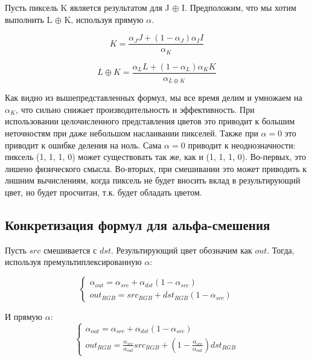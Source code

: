 Пусть пиксель K является результатом для  J $\oplus$ I. Предположим, что мы хотим выполнить L $\oplus$ K, используя прямую $\alpha$.

\begin{equation}
K = \frac{\alpha_{J}J + (1-\alpha_{J})\alpha_{I}I}{\alpha_{K}}
\end{equation}

\begin{equation}
L \oplus K = \frac{\alpha_{L}L + (1-\alpha_{L})\alpha_{K}K}{\alpha_{L \oplus K}}
\end{equation}

Как видно из вышепредставленных формул, мы все время делим и умножаем на $\alpha_{K}$, что сильно снижает производительность и эффективность. При использовании целочисленного представления цветов это приводит к большим неточностям при даже небольшом наслаивании пикселей. Также при $\alpha = 0$ это приводит к ошибке деления на ноль. Сама $\alpha = 0$ приводит к неоднозначности: пиксель (1, 1, 1, 0) может существовать так же, как и (1, 1, 1, 0). Во-первых, это лишено физического смысла. Во-вторых, при смешивании это может приводить к лишним вычислениям, когда пиксель не будет вносить вклад в результирующий цвет, но будет просчитан, т.к. будет обладать цветом. 

\subsection{Конкретизация формул для альфа-смешения}
Пусть $src$ смешивается с $dst$. Результирующий цвет обозначим как $out$.
Тогда, используя премультиплексированную $\alpha$: 

\begin{equation}
\begin{cases} \alpha_{out}= \alpha_{src} + \alpha_{dst}(1- \alpha_{src}) \\
out_{RGB} = src_{RGB} + dst_{RGB}(1-\alpha_{src})
\end{cases}
\end{equation}

И прямую $\alpha$:
\begin{equation}
\begin{cases} \alpha_{out} = \alpha_{src}+  \alpha_{dst}(1- \alpha_{src}) \\
out_{RGB} = \frac{\alpha_{src}}{\alpha_{out}} src_{RGB} + (1 - \frac{\alpha_{src}} {\alpha_{out}})dst_{RGB}
\end{cases}
\end{equation}
 

